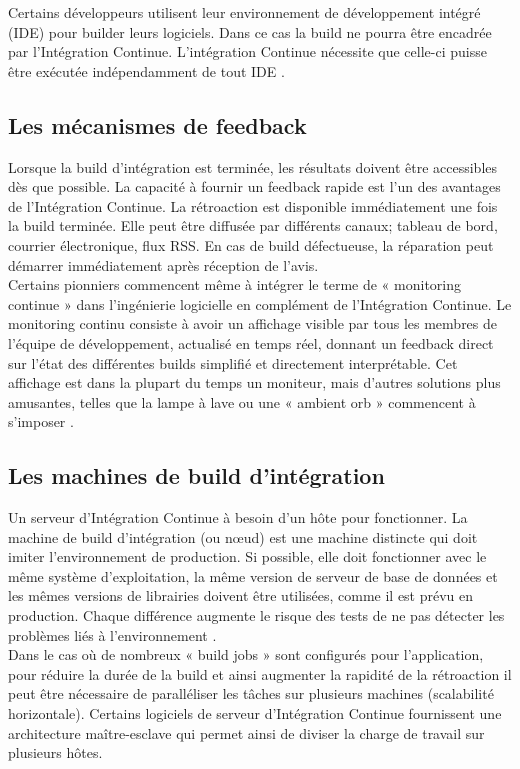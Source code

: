     Certains développeurs utilisent leur environnement de développement intégré (IDE) pour builder leurs logiciels. Dans ce cas la build ne pourra être encadrée par l’Intégration Continue. L’intégration Continue nécessite que celle-ci puisse être exécutée indépendamment de tout IDE \cite{Duv07}.

    \subsection{Les mécanismes de feedback}
    Lorsque la build d'intégration est terminée, les résultats doivent être accessibles dès que possible. La capacité à fournir un feedback rapide est l'un des avantages de l’Intégration Continue. La rétroaction est disponible immédiatement une fois la build terminée. Elle peut être diffusée par différents canaux; tableau de bord, courrier électronique, flux RSS. En cas de build défectueuse, la réparation peut démarrer immédiatement après réception de l'avis.\\

    Certains pionniers commencent même à intégrer le terme de « monitoring continue » dans l’ingénierie logicielle en complément de l’Intégration Continue. Le monitoring continu consiste à avoir un affichage visible par tous les membres de l’équipe de développement, actualisé en temps réel, donnant un feedback direct sur l’état des différentes builds simplifié et directement interprétable. Cet affichage est dans la plupart du temps un moniteur, mais d’autres solutions plus amusantes, telles que la lampe à lave ou une « ambient orb » commencent à s’imposer \cite{Swa04}.

    \subsection{Les machines de build d’intégration}
    Un serveur d’Intégration Continue à besoin d'un hôte pour fonctionner. La machine de build d’intégration (ou nœud) est une machine distincte qui doit imiter l'environnement de production. Si possible, elle doit fonctionner avec le même système d'exploitation, la même version de serveur de base de données et les mêmes versions de librairies doivent être utilisées, comme il est prévu en production. Chaque différence augmente le risque des tests de ne pas détecter les problèmes liés à l’environnement \cite{Fow06}.\\

    Dans le cas où de nombreux « build jobs » sont configurés pour l’application, pour réduire la durée de la build et ainsi augmenter la rapidité de la rétroaction il peut être nécessaire de paralléliser les tâches sur plusieurs machines (scalabilité horizontale). Certains logiciels de serveur d’Intégration Continue fournissent une architecture maître-esclave qui permet ainsi de diviser la charge de travail sur plusieurs hôtes.\\

